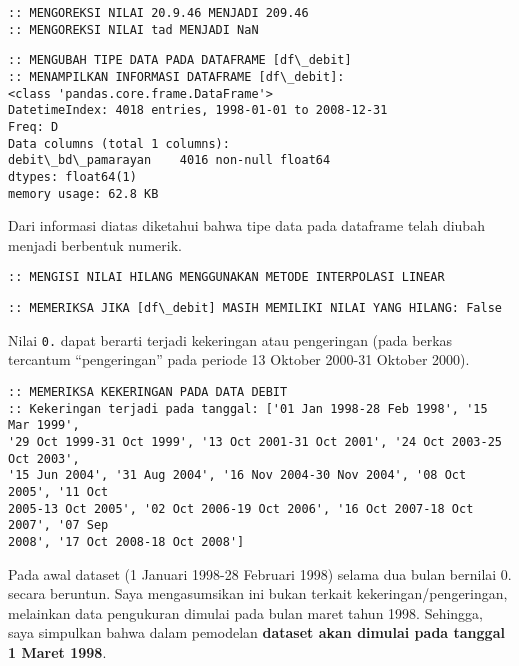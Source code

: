 \documentclass[11pt]{article}
\begin{document}
    \begin{Verbatim}[commandchars=\\\{\}]
:: MENGOREKSI NILAI 20.9.46 MENJADI 209.46
:: MENGOREKSI NILAI tad MENJADI NaN
    \end{Verbatim}

    \begin{Verbatim}[commandchars=\\\{\}]
:: MENGUBAH TIPE DATA PADA DATAFRAME [df\_debit]
:: MENAMPILKAN INFORMASI DATAFRAME [df\_debit]:
<class 'pandas.core.frame.DataFrame'>
DatetimeIndex: 4018 entries, 1998-01-01 to 2008-12-31
Freq: D
Data columns (total 1 columns):
debit\_bd\_pamarayan    4016 non-null float64
dtypes: float64(1)
memory usage: 62.8 KB
    \end{Verbatim}

    Dari informasi diatas diketahui bahwa tipe data pada dataframe telah
diubah menjadi berbentuk numerik.

    \begin{Verbatim}[commandchars=\\\{\}]
:: MENGISI NILAI HILANG MENGGUNAKAN METODE INTERPOLASI LINEAR
    \end{Verbatim}

    \begin{Verbatim}[commandchars=\\\{\}]
:: MEMERIKSA JIKA [df\_debit] MASIH MEMILIKI NILAI YANG HILANG: False
    \end{Verbatim}

    Nilai \texttt{0.} dapat berarti terjadi kekeringan atau pengeringan
(pada berkas tercantum ``pengeringan'' pada periode 13 Oktober 2000-31
Oktober 2000).

    \begin{Verbatim}[commandchars=\\\{\}]
:: MEMERIKSA KEKERINGAN PADA DATA DEBIT
:: Kekeringan terjadi pada tanggal: ['01 Jan 1998-28 Feb 1998', '15 Mar 1999',
'29 Oct 1999-31 Oct 1999', '13 Oct 2001-31 Oct 2001', '24 Oct 2003-25 Oct 2003',
'15 Jun 2004', '31 Aug 2004', '16 Nov 2004-30 Nov 2004', '08 Oct 2005', '11 Oct
2005-13 Oct 2005', '02 Oct 2006-19 Oct 2006', '16 Oct 2007-18 Oct 2007', '07 Sep
2008', '17 Oct 2008-18 Oct 2008']
    \end{Verbatim}

    Pada awal dataset (1 Januari 1998-28 Februari 1998) selama dua bulan
bernilai 0. secara beruntun. Saya mengasumsikan ini bukan terkait
kekeringan/pengeringan, melainkan data pengukuran dimulai pada bulan
maret tahun 1998. Sehingga, saya simpulkan bahwa dalam pemodelan
\textbf{dataset akan dimulai pada tanggal 1 Maret 1998}.
\end{document}
